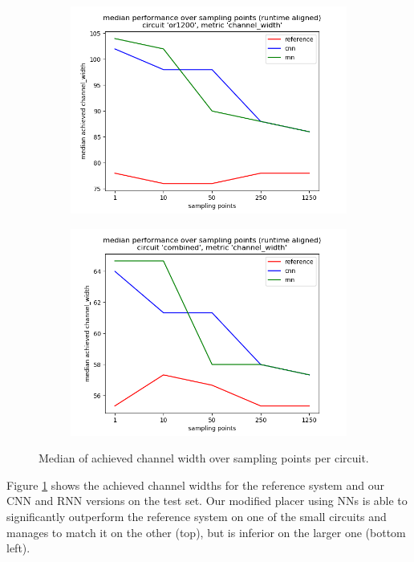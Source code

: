\begin{figure}
\begin{subfigure}[b]{0.49\linewidth}
	\end{subfigure}
	\begin{subfigure}[b]{0.49\linewidth}
		\includegraphics[width=\linewidth]{plots/eval-or1200-chan-width-median-full.png}
	\end{subfigure}
	\begin{subfigure}[b]{0.49\linewidth}
		\includegraphics[width=\linewidth]{plots/eval-combined-chan-width-median-full.png}
	\end{subfigure}
	\caption{Median of achieved channel width over sampling points per circuit.}
	\label{fig:eval-chan-width-median}
\end{figure}

Figure \ref{fig:eval-chan-width-median} shows the achieved channel widths for the reference system and our \gls{CNN} and \gls{RNN} versions on the test set. Our modified placer using \glspl{NN} is able to significantly outperform the reference system on one of the small circuits and manages to match it on the other (top), but is inferior on the larger one (bottom left). 

